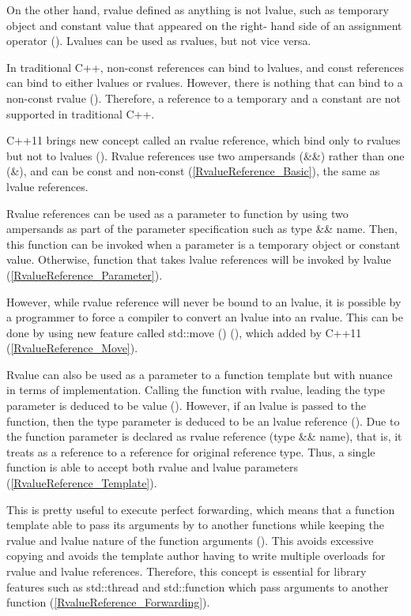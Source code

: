 \documentclass[11pt]{report}
\begin{document}
On the other hand, rvalue defined as anything is not lvalue, such as temporary object and constant value that appeared on the right- hand side of an assignment operator (\cite{Gregorie:professionalcpp}).  Lvalues can be used as rvalues, but not vice versa.

In traditional C++, non-const references can bind to lvalues, and const references can bind to either lvalues or rvalues. However, there is nothing that can bind to a non-const rvalue (\cite{Stroustrup:2012:Cpp11}). Therefore, a reference to a temporary and a constant are not supported in traditional C++.

C++11 brings new concept called an rvalue reference, which bind only to rvalues but not to lvalues (\cite{Gregorie:professionalcpp}). Rvalue references use two ampersands (\&\&) rather than one (\&), and can be const and non-const (\ref{RvalueReference_Basic}), the same as lvalue references.

Rvalue references can be used as a parameter to function by using two ampersands as part of the parameter specification such as type \&\& name. Then, this function can be invoked when a parameter is a temporary object or constant value. Otherwise, function that takes lvalue references will be invoked by lvalue (\ref{RvalueReference_Parameter}).

However, while rvalue reference will never be bound to an lvalue, it is possible by a programmer to force a compiler to convert an lvalue into an rvalue. This can be done by using new feature called std::move () (\cite{Gregorie:professionalcpp}), which added by C++11 (\ref{RvalueReference_Move}).

Rvalue can also be used as a parameter to a function template but with nuance in terms of implementation. Calling the function with rvalue, leading the type parameter is deduced to be value (\cite{Williams:2012:CCA}). However, if an lvalue is passed to the function, then the type parameter is deduced to be an lvalue reference (\cite{Williams:2012:CCA}). Due to the function parameter is declared as rvalue reference (type \&\& name), that is, it treats as a reference to a reference for original reference type. Thus, a single function is able to accept both rvalue and lvalue parameters (\ref{RvalueReference_Template}).

This is pretty useful to execute perfect forwarding, which means that a function template able to pass its arguments by to another functions while keeping the rvalue and lvalue nature of the function arguments (\cite{Williams:2012:CCA}). This avoids excessive copying and avoids the template author having to write multiple overloads for rvalue and lvalue references. Therefore, this concept is essential for library features such as std::thread and std::function which pass arguments to another function (\ref{RvalueReference_Forwarding}).
\end{document}
